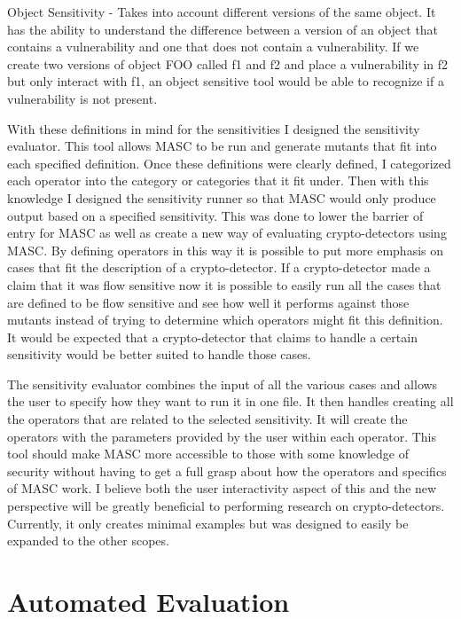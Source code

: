 Object Sensitivity - Takes into account different versions of the same object. It has the ability to understand the difference between a version of an object that contains a vulnerability and one that does not contain a vulnerability. If we create two versions of object FOO called f1 and f2 and place a vulnerability in f2 but only interact with f1, an object sensitive tool would be able to recognize if a vulnerability is not present.

With these definitions in mind for the sensitivities I designed the sensitivity evaluator. This tool allows MASC to be run and generate mutants that fit into each specified definition. Once these definitions were clearly defined, I categorized each operator into the category or categories that it fit under. Then with this knowledge I designed the sensitivity runner so that MASC would only produce output based on a specified sensitivity. This was done to lower the barrier of entry for MASC as well as create a new way of evaluating crypto-detectors using MASC. By defining operators in this way it is possible to put more emphasis on cases that fit the description of a crypto-detector. If a crypto-detector made a claim that it was flow sensitive now it is possible to easily run all the cases that are defined to be flow sensitive and see how well it performs against those mutants instead of trying to determine which operators might fit this definition. It would be expected that a crypto-detector that claims to handle a certain sensitivity would be better suited to handle those cases. 

The sensitivity evaluator combines the input of all the various cases and allows the user to specify how they want to run it in one file. It then handles creating all the operators that are related to the selected sensitivity. It will create the operators with the parameters provided by the user within each operator. This tool should make MASC more accessible to those with some knowledge of security without having to get a full grasp about how the operators and specifics of MASC work. I believe both the user interactivity aspect of this and the new perspective will be greatly beneficial to performing research on crypto-detectors. Currently, it only creates minimal examples but was designed to easily be expanded to the other scopes.


\section{Automated Evaluation}
\label{ch3:subsec:automation}

